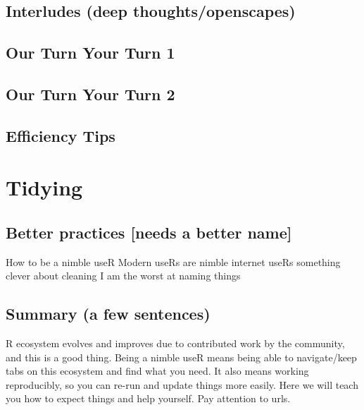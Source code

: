 \documentclass[]{book}
\begin{document}
\hypertarget{interludes-deep-thoughtsopenscapes-4}{%
\section{Interludes (deep thoughts/openscapes)}\label{interludes-deep-thoughtsopenscapes-4}}

\hypertarget{our-turn-your-turn-1-4}{%
\section{Our Turn Your Turn 1}\label{our-turn-your-turn-1-4}}

\hypertarget{our-turn-your-turn-2-4}{%
\section{Our Turn Your Turn 2}\label{our-turn-your-turn-2-4}}

\hypertarget{efficiency-tips-4}{%
\section{Efficiency Tips}\label{efficiency-tips-4}}

\hypertarget{tidying}{%
\chapter{Tidying}\label{tidying}}

\hypertarget{better-practices-needs-a-better-name}{%
\section{Better practices {[}needs a better name{]}}\label{better-practices-needs-a-better-name}}

How to be a nimble useR
Modern useRs are nimble internet useRs
something clever about cleaning
I am the worst at naming things

\hypertarget{summary-a-few-sentences-5}{%
\section{Summary (a few sentences)}\label{summary-a-few-sentences-5}}

R ecosystem evolves and improves due to contributed work by the community, and this is a good thing. Being a nimble useR means being able to navigate/keep tabs on this ecosystem and find what you need. It also means working reproducibly, so you can re-run and update things more easily. Here we will teach you how to expect things and help yourself. Pay attention to urls.
\end{document}
